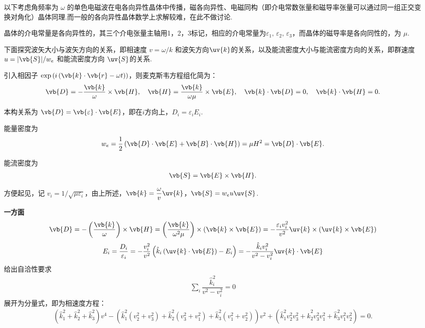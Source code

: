 以下考虑角频率为 \(\omega\) 的单色电磁波在电各向异性晶体中传播，磁各向异性、电磁同构（即介电常数张量和磁导率张量可以通过同一组正交变换对角化）晶体同理.而一般的各向异性晶体数学上求解较难，在此不做讨论.

晶体的介电常量是各向异性的，其三个介电张量主轴用1，2，3标记，相应的介电常量为\(\varepsilon_1,\,\varepsilon_2,\,\varepsilon_3\)，而晶体的磁导率是各向同性的，为 \(\mu\).

下面探究波矢大小与波矢方向的关系，即相速度 \(v = \omega/k\) 和波矢方向\(\uv{k}\)的关系，以及能流密度大小与能流密度方向的关系，即群速度 \(u = |\vb{S}|/w_e\) 和能流密度方向 \(\uv{S}\)的关系.

引入相因子 \(\exp\left(i\left(\vb{k} \cdot \vb{r} - \omega t\right)\right)\)，则麦克斯韦方程组化简为：
\begin{align*}
	\vb{D} = -\dfrac{\vb{k}}{\omega}\times \vb{H}, \quad
	\vb{H} = \dfrac{\vb{k}}{\omega \mu} \times \vb{E}, \quad
	\vb{k} \cdot \vb{D} = 0, \quad
	\vb{k} \cdot \vb{H} = 0.
\end{align*}

本构关系为 \(\vb{D} = \vb{\varepsilon} \cdot \vb{E}\)，即在\(i\)方向上，\(D_i = \varepsilon_i E_i\).

能量密度为
\begin{align*}
	w_e = \dfrac{1}{2} \left( \vb{D} \cdot \vb{E} + \vb{B} \cdot \vb{H} \right) = \mu H^2 = \vb{D} \cdot \vb{E}.
\end{align*}

能流密度为
\begin{align*}
	\vb{S} = \vb{E} \times \vb{H}.
\end{align*}

方便起见，记 \(v_i = 1/\sqrt{\mu \varepsilon_i}\)，由上所述，\(\vb{k} = \dfrac{\omega}{v} \uv{k}\)，\(\vb{S} = w_e u \uv{S}\).

\textbf{一方面}
\begin{align*}
	\vb{D} = -\left( \dfrac{\vb{k}}{\omega} \right) \times \vb{H} = \left( \dfrac{\vb{k}}{\omega^2 \mu} \right) \times \left( \vb{k} \times \vb{E} \right) = -\dfrac{\varepsilon_i v_i^2}{v^2} \uv{k} \times \left( \uv{k} \times \vb{E} \right)
\end{align*}
\begin{align*}
	E_i =\frac{D_i}{\varepsilon_i}= -\dfrac{v_i^2}{v^2} \left(\hat{k}_i\left(\uv{k}\cdot\vb{E}\right)-E_i\right) = -\dfrac{\hat{k}_i v_i^2}{v^2 - v_i^2} \uv{k} \cdot \vb{E}
\end{align*}
给出自洽性要求
\begin{align*}
	\sum_i \dfrac{\hat{k}_i^2}{v^2 - v_i^2} = 0
\end{align*}
展开为分量式，即为相速度方程：
\begin{align*}
	\left(\hat{k}_1^2 + \hat{k}_2^2 + \hat{k}_3^2\right) v^4 - \left( \hat{k}_1^2 \left(v_2^2 + v_3^2\right) + \hat{k}_2^2 \left(v_3^2 + v_1^2\right) + \hat{k}_3^2 \left(v_1^2 + v_2^2\right) \right) v^2 + \left( \hat{k}_1^2 v_2^2 v_3^2 + \hat{k}_2^2 v_3^2 v_1^2 + \hat{k}_3^2 v_1^2 v_2^2 \right) = 0.
\end{align*}

